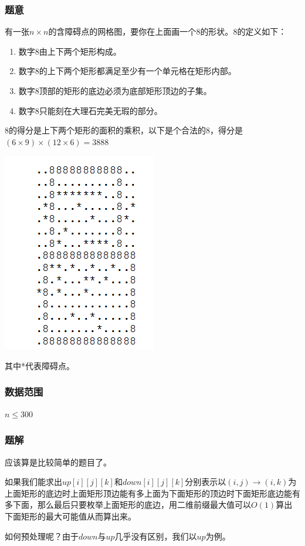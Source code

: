 \documentclass{ctexart}
\begin{document}
\subsubsection{题意}
有一张$n \times n$的含障碍点的网格图，要你在上面画一个$8$的形状。$8$的定义如下：
\begin{enumerate}
\item 数字$8$由上下两个矩形构成。
\item 数字$8$的上下两个矩形都满足至少有一个单元格在矩形内部。
\item 数字$8$顶部的矩形的底边必须为底部矩形顶边的子集。
\item 数字$8$只能刻在大理石完美无瑕的部分。
\end{enumerate}

$8$的得分是上下两个矩形的面积的乘积，以下是个合法的$8$，得分是$(6 \times 9) \times (12 \times 6)=3888$

\includegraphics{eight.png}

其中*代表障碍点。
\subsubsection{数据范围}
$n \le 300$
\subsubsection{题解}
应该算是比较简单的题目了。

如果我们能求出$up[i][j][k]$和$down[i][j][k]$分别表示以$(i,j)\rightarrow(i,k)$为上面矩形的底边时上面矩形顶边能有多上面为下面矩形的顶边时下面矩形底边能有多下面，那么最后只要枚举上面矩形的底边，用二维前缀最大值可以$O(1)$算出下面矩形的最大可能值从而算出来。

如何预处理呢？由于$down$与$up$几乎没有区别，我们以$up$为例。
\end{document}

